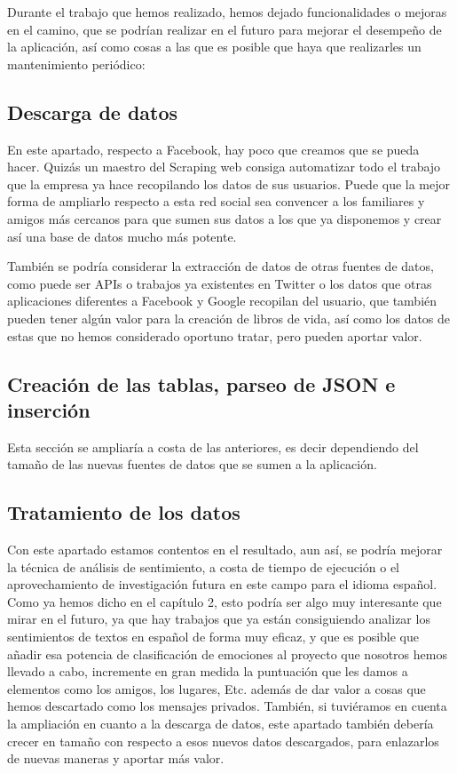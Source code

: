 Durante el trabajo que hemos realizado, hemos dejado funcionalidades o mejoras en el camino, que se podrían realizar en el futuro para mejorar el desempeño de la aplicación, así como cosas a las que es posible que haya que realizarles un mantenimiento periódico:

\subsection*{Descarga de datos}
En este apartado, respecto a Facebook, hay poco que creamos que se pueda hacer. Quizás un maestro del Scraping web consiga automatizar todo el trabajo que la empresa ya hace recopilando los datos de sus usuarios. Puede que la mejor forma de ampliarlo respecto a esta red social sea convencer a los familiares y amigos más cercanos para que sumen sus datos a los que ya disponemos y crear así una base de datos mucho más potente.

También se podría considerar la extracción de datos de otras fuentes de datos, como puede ser APIs o trabajos ya existentes en Twitter o los datos que otras aplicaciones diferentes a Facebook y Google recopilan del usuario, que también pueden tener algún valor para la creación de libros de vida, así como los datos de estas que no hemos considerado oportuno tratar, pero pueden aportar valor.

\subsection*{Creación de las tablas, parseo de JSON e inserción}
 Esta sección se ampliaría a costa de las anteriores, es decir dependiendo del tamaño de las nuevas fuentes de datos que se sumen a la aplicación.
 
\subsection*{Tratamiento de los datos}
Con este apartado estamos contentos en el resultado, aun así, se podría mejorar la técnica de análisis de sentimiento, a costa de tiempo de ejecución o el aprovechamiento de investigación futura en este campo para el idioma español. Como ya hemos dicho en el capítulo 2, esto podría ser algo muy interesante que mirar en el futuro, ya que hay trabajos que ya están consiguiendo analizar los sentimientos de textos en español de forma muy eficaz, y que es posible que añadir esa potencia de clasificación de emociones al proyecto que nosotros hemos llevado a cabo, incremente en gran medida la puntuación que les damos a elementos como los amigos, los lugares, Etc. además de dar valor a cosas que hemos descartado como los mensajes privados. También, si tuviéramos en cuenta la ampliación en cuanto a la descarga de datos, este apartado también debería crecer en tamaño con respecto a esos nuevos datos descargados, para enlazarlos de nuevas maneras y aportar más valor.

